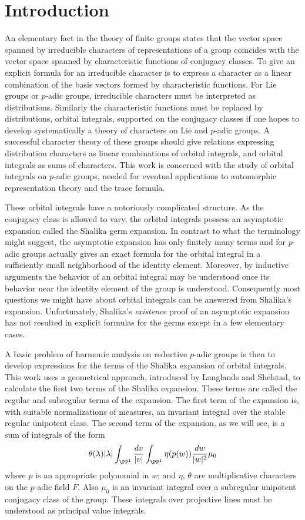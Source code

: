 \documentclass{memo-l}
\theoremstyle{definition}
\theoremstyle{remark}
\numberwithin{section}{chapter}
\numberwithin{equation}{chapter}
\begin{document}
\chapter*{Introduction}

An elementary fact in the theory of finite groups states that the vector
space spanned by irreducible characters of representations of a group coincides
with the vector space spanned by characteristic functions of conjugacy classes.
To give an explicit formula for an irreducible character is to express a character
as a linear combination of the basis vectors formed by characteristic functions.
For Lie groups or $p$-adic groups, irreducible characters must be interpreted
as distributions.  Similarly the characteristic functions must be replaced by
distributions, orbital integrals,  supported on the conjugacy classes if one
hopes to develop systematically a theory of characters on Lie and $p$-adic groups.
A successful character theory of these groups should give relations expressing
distribution characters as linear combinations of orbital integrals, and
orbital integrals as sums of characters.  This work is concerned
with the study of orbital integrals on $p$-adic groups, needed for eventual applications
to automorphic representation theory and the trace formula.

These orbital integrals have a notoriously complicated structure.  As
the conjugacy class is allowed to vary, the orbital integrals possess
an asymptotic expansion called the Shalika germ expansion.  In
contrast to what the terminology might suggest, the asymptotic
expansion has only finitely many terms and for $p$-adic groups
actually gives an exact formula for the orbital integral in a
sufficiently small neighborhood of the identity element.  Moreover, by
inductive arguments the behavior of an orbital integral may be
understood once its behavior near the identity element of the group is
understood.  Consequently most questions we might have about orbital
integrals can be answered from Shalika's expansion.  Unfortunately,
Shalika's {\it existence} proof of an asymptotic expansion has not
resulted in explicit formulas for the germs except in a few elementary
cases.

A basic problem of harmonic analysis on reductive $p$-adic groups is
then to develop expressions for the terms of the Shalika expansion of
orbital integrals.  This work uses a geometrical approach, introduced
by Langlands and Shelstad, to calculate the first two terms of the
Shalika expansion.  These terms are called the regular and subregular
terms of the expansion.  The first term of the expansion is, with
suitable normalizations of measures, an invariant integral over the
stable regular unipotent class.  The second term of the expansion, as
we will see, is a sum of integrals of the form
\[
 \theta(\lambda)|\lambda|\int_{\PP^1} {\frac {dv}{|v|}}
\int_{\PP^1}\eta(p(w))\frac {dw}{|w|^2} \mu_0
\]
where $p$ is an appropriate polynomial in $w$; and $\eta$, $\theta$
are multiplicative characters on the $p$-adic field $F$. Also $\mu_0$
is an invariant integral over a subregular unipotent conjugacy class
of the group.  These integrals over projective lines must be
understood as principal value integrals.
\end{document}
